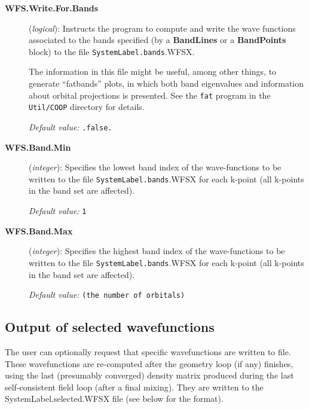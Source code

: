\documentclass[11pt]{article}
\begin{document}
\begin{description}

\item[{\bf WFS.Write.For.Bands}] ({\it logical}):
Instructs the program to compute and write the wave functions
associated to the bands specified (by a {\bf BandLines} or a {\bf
  BandPoints} block) to the file {\tt SystemLabel.bands}.WFSX.

The information in this file might be useful, among other things, to
generate ``fatbands'' plots, in which both  band eigenvalues and
information about orbital projections is presented.
 See the
\texttt{fat} program in the \texttt{Util/COOP} directory for details.

{\it Default value:} {\tt .false.}

\item[{\bf WFS.Band.Min}] ({\it integer}):
Specifies the lowest band index of the wave-functions to be written to 
the file {\tt SystemLabel.bands}.WFSX for each k-point (all k-points
in the band set are affected). 

{\it Default value:} {\tt 1}

\item[{\bf WFS.Band.Max}] ({\it integer}):
Specifies the highest band index of the wave-functions to be written to 
the file {\tt SystemLabel.bands}.WFSX for each k-point (all k-points
in the band set are affected).

{\it Default value:} {\tt (the number of orbitals)}

\end{description}


\subsection{Output of selected wavefunctions}
\label{sec:wf-output-user}

The user can optionally request that specific wavefunctions are
written to file. These wavefunctions are re-computed after the
geometry loop (if any) finishes, using the last (presumably converged)
density matrix produced during the last self-consistent field loop
(after a final mixing). They are written to the
SystemLabel.selected.WFSX file (see below for the format).
\end{document}
